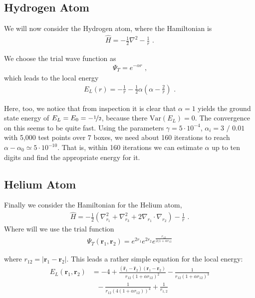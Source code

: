 \subsection{Hydrogen Atom}
We will now consider the Hydrogen atom, where the Hamiltonian is
\begin{align*}
  \hat{H} = -\frac{1}{2}\nabla^2 - \frac{1}{r} \text{~.}
\end{align*}

We choose the trial wave function as
  \begin{align*}
    \Psi_T = e^{-\alpha r} \text{~,}
  \end{align*}
which leads to the local energy
  \begin{align*}
    E_L(r) = - \frac{1}{r} - \frac{1}{2}\alpha \left(\alpha - \frac{2}{r}\right) \text{~.}
  \end{align*}

Here, too, we notice that from inspection it is clear that $\alpha = 1$ yields the ground state energy of $E_L = E_0 = -\nicefrac{1}{2}$, because there $\text{Var}(E_L) = 0$. The convergence on this seems to be quite fast. Using the parameters $\gamma = 5\cdot 10^{-4}$, $\alpha_i = 3 \text{~/~}0.01$ with 5,000 test points over $7$ boxes, we need about 160 iterations to reach $\alpha-\alpha_0 \simeq 5 \cdot 10^{-10}$. That is, within 160 iterations we can estimate $\alpha$ up to ten digits and find the appropriate energy for it. 


\subsection{Helium Atom}
Finally we consider the Hamiltonian for the Helium atom,
\begin{align*}
  \hat{H} = -\frac{1}{2} \left(\nabla_{r_1}^2 + \nabla_{r_3}^2 + 2\nabla_{r_1}\cdot \nabla_{r_2}\right)  - \frac{1}{r} \text{~.}
\end{align*}
Where will we use the trial function
  \begin{align*}
    \Psi_T (\textbf{r}_1,\textbf{r}_2) = e^{2r_1}e^{2r_2}e^{\frac{r_{12}}{2(1+\alpha r_{12}}}
  \end{align*}

where $r_{12} =  \left|\textbf{r}_1 - \textbf{r}_2 \right| $. This leads a rather simple equation for the local energy:
\begin{align*}
    E_L(\textbf{r}_1,\textbf{r}_2) &= -4  +  \frac{(\hat{\textbf{r}}_1 - \hat{\textbf{r}}_2) (\textbf{r}_1 - \textbf{r}_2)}{r_{12}(1+\alpha r_{12})^2} - \frac{1}{r_{12}(1+\alpha r_{12})^3}  \\
    &~~~ - \frac{1}{r_{12}(4(1+\alpha r_{12}))^4} + \frac{1}{r_{1,2}}
\end{align*}
  
